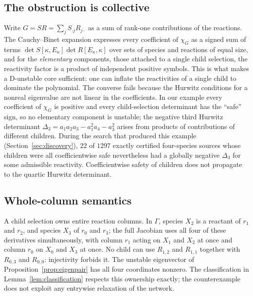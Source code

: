 \documentclass[11pt,a4paper]{article}
\theoremstyle{definition}
\theoremstyle{remark}
\begin{document}
\subsection{The obstruction is collective}

Write $G=SR=\sum_{j}S_{\cdot j}R_{j\cdot}$ as a sum of rank-one contributions of the reactions. The Cauchy--Binet expansion \cite{Vassena2023Symbolic,VassenaStadler2024} expresses every coefficient of $\chi_G$ as a signed sum of terms $\det S[\kappa,E_\kappa]\det R[E_\kappa,\kappa]$ over sets of species and reactions of equal size, and for the \emph{elementary} components, those attached to a single child selection, the reactivity factor is a product of independent positive symbols. This is what makes a D-unstable core sufficient: one can inflate the reactivities of a single child to dominate the polynomial. The converse fails because the Hurwitz conditions for a nonreal eigenvalue are not linear in the coefficients. In our example every coefficient of $\chi_G$ is positive and every child-selection determinant has the ``safe'' sign, so no elementary component is unstable; the negative third Hurwitz determinant $\Delta_3=a_1a_2a_3-a_1^2a_4-a_3^2$ arises from products of contributions of different children. During the search that produced this example (Section~\ref{sec:discovery}), $22$ of $1297$ exactly certified four-species sources whose children were all coefficientwise safe nevertheless had a globally negative $\Delta_3$ for some admissible reactivity. Coefficientwise safety of children does not propagate to the quartic Hurwitz determinant.

\subsection{Whole-column semantics}

A child selection owns entire reaction columns. In $\Gamma$, species $X_2$ is a reactant of $r_1$ and $r_2$, and species $X_3$ of $r_0$ and $r_3$; the full Jacobian uses all four of these derivatives simultaneously, with column $r_1$ acting on $X_1$ and $X_2$ at once and column $r_0$ on $X_0$ and $X_3$ at once. No child can use $R_{1,2}$ and $R_{1,1}$ together with $R_{0,3}$ and $R_{0,0}$: injectivity forbids it. The unstable eigenvector of Proposition~\ref{prop:eigenpair} has all four coordinates nonzero. The classification in Lemma~\ref{lem:classification} respects this ownership exactly; the counterexample does not exploit any entrywise relaxation of the network.
\end{document}
